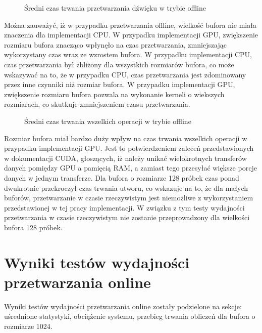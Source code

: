 \begin{figure}[H]
    \centering
    \scalebox{1.0}{}
    \caption{Średni czas trwania przetwarzania dźwięku w trybie offline}
    \label{fig:Średni czas trwania przetwarzania dźwięku w trybie offline}
\end{figure}

Można zauważyć, iż w przypadku przetwarzania offline, wielkość bufora nie miała znaczenia dla implementacji CPU. W przypadku implementacji GPU, zwiększenie rozmiaru bufora znacząco wpłynęło na czas przetwarzania, zmniejszając wykorzystany czas wraz ze wzrostem bufora. W przypadku implementacji CPU, czas przetwarzania był zbliżony dla wszystkich rozmiarów bufora, co może wskazywać na to, że w przypadku CPU, czas przetwarzania jest zdominowany przez inne czynniki niż rozmiar bufora. W przypadku implementacji GPU, zwiększenie rozmiaru bufora pozwala na wykonanie kerneli o wiekszych rozmiarach, co skutkuje zmniejszeniem czasu przetwarzania.

\begin{figure}[H]
    \centering
    \scalebox{1.0}{}
    \caption{Średni czas trwania wszelkich operacji w trybie offline}
    \label{fig:Średni czas trwania wszelkich operacji w trybie offline}
\end{figure}

Rozmiar bufora miał bardzo duży wpływ na czas trwania wszelkich operacji w przypadku implementacji GPU. Jest to potwierdzeniem zaleceń przedstawionych w dokumentacji CUDA\cite{bib:CUDA}, głoszących, iż należy unikać wielokrotnych transferów danych pomiędzy GPU a pamięcią RAM, a zamiast tego przesyłać większe porcje danych w jednym transferze. Dla bufora o rozmiarze 128 próbek czas ponad dwukrotnie przekroczył czas trwania utworu, co wskazuje na to, że dla małych buforów, przetwarzanie w czasie rzeczywistym jest niemożliwe z wykorzystaniem przedstawionej w tej pracy implementacji. W związku z tym testy wydajności przetwarzania w czasie rzeczywistym nie zostanie przeprowadzony dla wielkości bufora 128 próbek.

\section{Wyniki testów wydajności przetwarzania online}
Wyniki testów wydajności przetwarzania online zostały podzielone na sekcje: uśrednione statystyki, obciążenie systemu, przebieg trwania obliczeń dla bufora o rozmiarze 1024.

